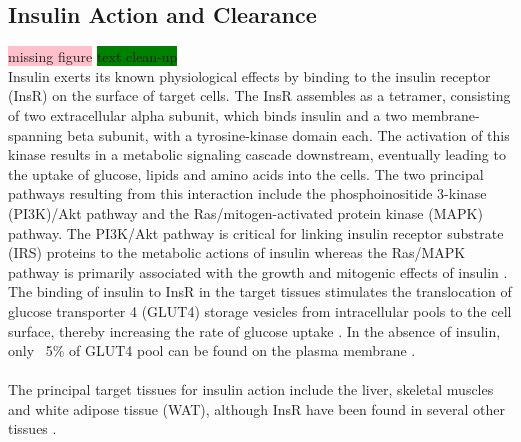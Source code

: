 \subsection{Insulin Action and Clearance} %
\label{sec:insact}
\colorbox{pink}{missing figure} \colorbox{green}{text clean-up} \\
Insulin exerts its known physiological effects by binding to the insulin receptor (InsR) on the surface of target cells. The InsR assembles as a tetramer, consisting of two extracellular alpha subunit, which binds insulin and a two membrane-spanning beta subunit, with a tyrosine-kinase domain each. The activation of this kinase results in a metabolic signaling cascade downstream, eventually leading to the uptake of glucose, lipids and amino acids into the cells. The two principal pathways resulting from this interaction include the phosphoinositide 3-kinase (PI3K)/Akt pathway and the Ras/mitogen-activated protein kinase (MAPK) pathway. The PI3K/Akt pathway is critical for linking insulin receptor substrate (IRS) proteins to the metabolic actions of insulin whereas the Ras/MAPK pathway is primarily associated with the growth and mitogenic effects of insulin \textbf{\cite{de_meyts_insulin_2000}}. The binding of insulin to InsR in the target tissues stimulates the translocation of glucose transporter 4 (GLUT4) storage vesicles from intracellular pools to the cell surface, thereby increasing the rate of glucose uptake \textbf{\cite{shepherd_glucose_1999,saltiel_insulin_2001,leto_regulation_2012}}. In the absence of insulin, only ~5\% of GLUT4 pool can be found on the plasma membrane \textbf{\cite{leto_regulation_2012}}.\\\\
The principal target tissues for insulin action include the liver, skeletal muscles and white adipose tissue (WAT), although InsR have been found in several other tissues \textbf{\cite{spencer_identification_2018}}.


